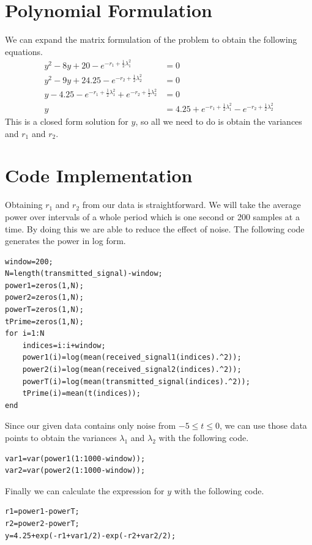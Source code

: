 \documentclass[12pt]{article}
\begin{document}
\section{Polynomial Formulation}

We can expand the matrix formulation of the problem to obtain the following equations.
\begin{align*}
    y^2-8y+20-e^{-r_1+\frac{1}{2}\lambda_1^2}&=0\\
    y^2-9y+24.25-e^{-r_2+\frac{1}{2}\lambda_2^2}&=0\\
    y-4.25-e^{-r_1+\frac{1}{2}\lambda_1^2}+e^{-r_2+\frac{1}{2}\lambda_2^2}&=0\\
    y&=4.25+e^{-r_1+\frac{1}{2}\lambda_1^2}-e^{-r_2+\frac{1}{2}\lambda_2^2}
\end{align*}
This is a closed form solution for \(y\), so all we need to do is obtain the variances
and \(r_1\) and \(r_2\).

\section{Code Implementation}

Obtaining \(r_1\) and \(r_2\) from our data is straightforward. We will take the average power over
intervals of a whole period which is one second or 200 samples at a time. By doing this we are able
to reduce the effect of noise. The following code generates the power in log form.
\begin{verbatim}
window=200;
N=length(transmitted_signal)-window;
power1=zeros(1,N);
power2=zeros(1,N);
powerT=zeros(1,N);
tPrime=zeros(1,N);
for i=1:N
    indices=i:i+window;
    power1(i)=log(mean(received_signal1(indices).^2));
    power2(i)=log(mean(received_signal2(indices).^2));
    powerT(i)=log(mean(transmitted_signal(indices).^2));
    tPrime(i)=mean(t(indices));
end
\end{verbatim}
Since our given data contains only noise from \(-5\leq t \leq 0\), we can use those data points to
obtain the variances \(\lambda_1\) and \(\lambda_2\) with the following code.
\begin{verbatim}
var1=var(power1(1:1000-window));
var2=var(power2(1:1000-window));
\end{verbatim}
Finally we can calculate the expression for \(y\) with the following code.
\begin{verbatim}
r1=power1-powerT;
r2=power2-powerT;
y=4.25+exp(-r1+var1/2)-exp(-r2+var2/2);
\end{verbatim}
\end{document}
